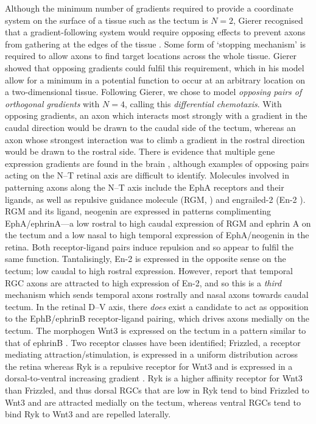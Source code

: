 \documentclass[9pt]{elife} %
\begin{document}
Although the minimum number of gradients required to provide a coordinate system on the surface of a tissue such as the tectum is $N=2$, Gierer recognised that a gradient-following system would require opposing effects to prevent axons from gathering at the edges of the tissue \citep{gierer_model_1983}.
Some form of `stopping mechanism' is required to allow axons to find target locations across the whole tissue. Gierer showed that opposing gradients could fulfil this requirement, which in his model allow for a minimum in a potential function to occur at an arbitrary location on a two-dimensional tissue.
Following Gierer, we chose to model \emph{opposing pairs of orthogonal gradients} with $N=4$, calling this \emph{differential chemotaxis}.
With opposing gradients, an axon which interacts most strongly with a gradient in the caudal direction would be drawn to the caudal side of the tectum, whereas an axon whose strongest interaction was to climb a gradient in the rostral direction would be drawn to the rostral side.
There is evidence that multiple gene expression gradients are found in the brain \citep{cang_developmental_2013}, although examples of opposing pairs acting on the N--T retinal axis are difficult to identify.
Molecules involved in patterning axons along the N--T axis include the EphA receptors and their ligands, as well as repulsive guidance molecule (RGM, \citet{monnier_rgm_2002}) and engrailed-2 (En-2 \citet{brunet_transcription_2005}).
RGM and its ligand, neogenin are expressed in patterns complimenting EphA/ephrinA---a low rostral to high caudal expression of RGM and ephrin A on the tectum and a low nasal to high temporal expression of EphA/neogenin in the retina. Both receptor-ligand pairs induce repulsion and so appear to fulfil the same function.
Tantalisingly, En-2 is expressed in the opposite sense on the tectum; low caudal to high rostral expression. However, \citet{brunet_transcription_2005} report that temporal RGC axons are attracted to high expression of En-2, and so this is a \emph{third} mechanism which sends temporal axons rostrally and nasal axons towards caudal tectum.
In the retinal D--V axis, there \emph{does} exist a candidate to act as opposition to the EphB/ephrinB receptor-ligand pairing, which drives axons medially on the tectum.
The morphogen Wnt3 is expressed on the tectum in a pattern similar to that of ephrinB \citep{schmitt_wntryk_2006}.
Two receptor classes have been identified; Frizzled, a receptor mediating attraction/stimulation, is expressed in a uniform distribution across the retina whereas Ryk is a repulsive receptor for Wnt3 and is expressed in a dorsal-to-ventral increasing gradient \citep{schmitt_wntryk_2006}. Ryk is a higher affinity receptor for Wnt3 than Frizzled, and thus dorsal RGCs that are low in Ryk tend to bind Frizzled to Wnt3 and are attracted medially on the tectum, whereas ventral RGCs tend to bind Ryk to Wnt3 and are repelled laterally.
\end{document}
